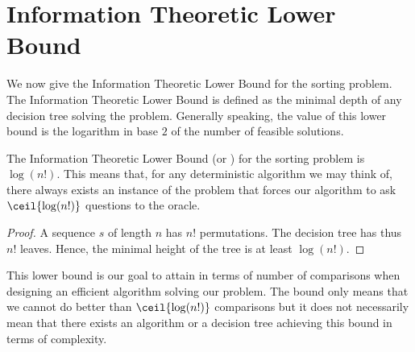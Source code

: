 \section{Information Theoretic Lower Bound}
\label{tree:sorting:ITLB}

We now give the Information Theoretic Lower Bound for the sorting problem. The
Information Theoretic Lower Bound is defined as the minimal depth of any
decision tree solving the problem. Generally speaking, the value of this lower
bound is the logarithm in base \(2\) of the number of feasible solutions.


\begin{theorem}
The Information Theoretic Lower Bound (or ) for the sorting problem is
\(\log(n!)\). This means that, for any deterministic algorithm we may think of,
there always exists an instance of the problem that forces our
algorithm to ask \(\ceil{\log(n!)}\) questions to the oracle.
\end{theorem}

\begin{proof}
A sequence \(s\) of length \(n\) has \(n!\) permutations. The decision tree has thus
\(n!\) leaves. Hence, the minimal height of the tree is at least \(\log(n!)\).
\end{proof}

This lower bound is our goal to attain in terms of number of comparisons
when designing an efficient algorithm solving our problem. The bound only means
that we cannot do better than \(\ceil{\log(n!)}\) comparisons but it does not
necessarily mean that there exists an algorithm or a decision tree achieving
this bound in terms of complexity.
